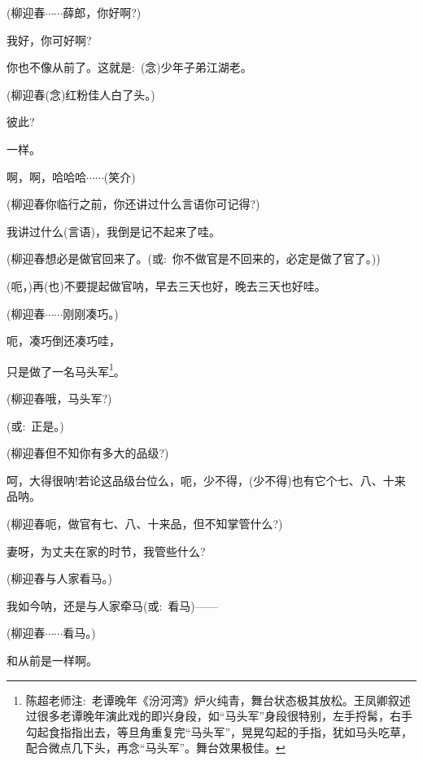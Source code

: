 {{(柳迎春\hspace{20pt}$\cdots{}\cdots{}$薛郎，你好啊?)

我好，你可好啊?

你也不像从前了。这就是:~({\akai 念})少年子弟江湖老。

(柳迎春\hspace{20pt}({\akai 念})红粉佳人白了头。)

彼此?

一样。

啊，啊，哈哈哈$\cdots{}\cdots{}$({\hwfs 笑}{\hwfs 介})

(柳迎春\hspace{20pt}你临行之前，你还讲过什么言语你可记得?)

我讲过什么(言语)，我倒是记不起来了哇。

(柳迎春\hspace{20pt}想必是做官回来了。({\akai 或}:~你不做官是不回来的，必定是做了官了。))

(呃，)再(也)不要提起做官呐，早去三天也好，晚去三天也好哇。

(柳迎春\hspace{20pt}$\cdots{}\cdots{}$刚刚凑巧。)

呃，凑巧倒还凑巧哇，

只是做了一名马头军\footnote{陈超老师注:~老谭晚年《汾河湾》炉火纯青，舞台状态极其放松。王凤卿叙述过很多老谭晚年演此戏的即兴身段，如``马头军''身段很特别，左手捋髯，右手勾起食指指出去，等旦角重复完``马头军''，晃晃勾起的手指，犹如马头吃草，配合微点几下头，再念``马头军''。舞台效果极佳。}。

(柳迎春\hspace{20pt}哦，马头军?)

({\akai 或}:~正是。)

(柳迎春\hspace{20pt}但不知你有多大的品级?)

呵，大得很呐!若论这品级台位么，呃，少不得，(少不得)也有它个七、八、十来品呐。

(柳迎春\hspace{20pt}呃，做官有七、八、十来品，但不知掌管什么?)

妻呀，为丈夫在家的时节，我管些什么?

(柳迎春\hspace{20pt}与人家看马。)

我如今呐，还是与人家牵马({\akai 或}:~看马)------

(柳迎春\hspace{20pt}$\cdots{}\cdots{}$看马。)

和从前是一样啊。

}}
